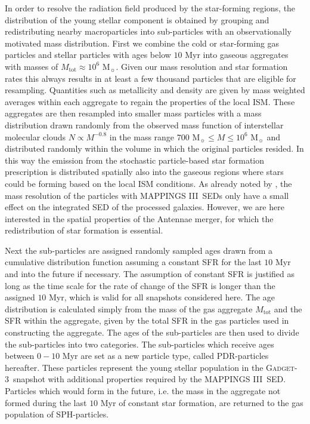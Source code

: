 \documentclass[a4paper,fleqn,usenatbib]{mnras}
\newcommand{\gadget}{\textsc{Gadget-3}}
\newcommand{\mappings}{\textsc{MAPPINGS III}}
\begin{document}
In order to resolve the radiation field produced by the star-forming regions, 
the distribution of the young stellar component is obtained by grouping and 
redistributing nearby macroparticles into sub-particles with an observationally 
motivated mass distribution.  
First we combine the cold or star-forming gas particles and stellar particles with ages below $10$ 
Myr into gaseous aggregates with masses of $M_\mathrm{tot}\approx10^6$ M$_{\sun}$. 
Given our mass resolution and star formation rates this always results in at least 
a few thousand particles that are eligible for resampling.
Quantities such as metallicity and density
are given by mass weighted averages within each aggregate to regain the properties of the local ISM. 
These aggregates are then resampled into smaller mass particles 
with a mass distribution drawn randomly from the observed mass function of 
interstellar molecular clouds $N\propto M^{-0.8}$ \citep{1998A&A...331L..65H,
1998A&A...329..249K} in the mass range $700$ M$_{\sun}\le M \le 10^6$ M$_{\sun}$ 
and distributed randomly within the volume in which the original particles resided.
In this way the emission from the stochastic particle-based star formation prescription is distributed spatially also into
the gaseous regions where stars could be forming based on the local ISM conditions. As already noted by \citet{2010MNRAS.403...17J},
the mass resolution of the particles with \mappings\ SEDs only have a small effect on the integrated SED of the processed
galaxies. However, we are here interested in the spatial properties of the Antennae merger, for which the redistribution
of star formation is essential.

Next the sub-particles are assigned randomly sampled ages drawn from a cumulative
distribution function assuming a constant SFR for the last $10$ Myr and into the future if necessary.
The assumption of constant SFR is justified as long as the time scale for the rate of change of the 
SFR is longer than the assigned $10$ Myr, which is valid for all snapshots considered here.
The age distribution is calculated simply from the mass of the 
gas aggregate $M_\mathrm{tot}$ and the SFR within the aggregate, given by the total SFR in the gas particles 
used in constructing the aggregate. 
The ages of the sub-particles are then 
used to divide the sub-particles into two categories. The sub-particles which receive ages between $0- 10$
Myr are set as a new particle type, called PDR-particles hereafter. These particles represent the young stellar population in the \gadget\ snapshot
with additional properties required by the \mappings\ SED. Particles which would form in the future,
i.e. the mass in the aggregate not formed during the last $10$ Myr of constant star formation, are returned to the gas population of 
SPH-particles.
\end{document}
